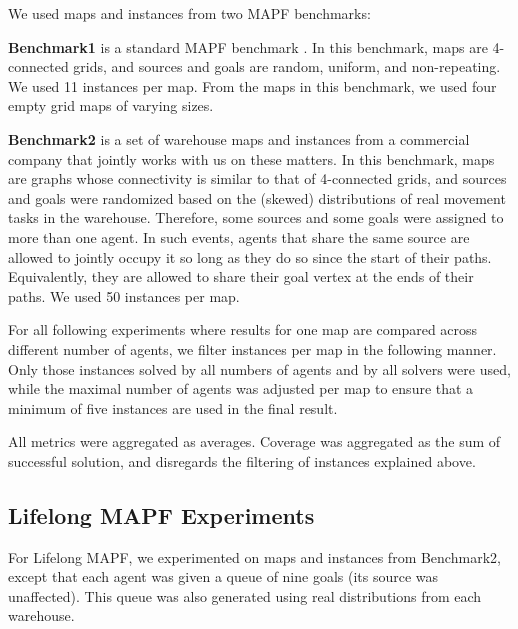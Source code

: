 \documentclass{article}
\newcommand{\benchone}{Benchmark1\xspace}
\newcommand{\benchtwo}{Benchmark2\xspace}
\newcommand{\lm}{Lifelong MAPF\xspace}
\begin{document}
We used maps and instances from two MAPF benchmarks:

\textbf{\benchone} is a standard MAPF benchmark \cite{stern2019multi}. In this benchmark, maps are 4-connected grids, and sources and goals are random, uniform, and non-repeating. We used 11 instances per map. From the maps in this benchmark, we used four empty grid maps of varying sizes.

\textbf{\benchtwo} is a set of warehouse maps and instances from a commercial company that jointly works with us on these matters. In this benchmark, maps are graphs whose connectivity is similar to that of 4-connected grids, and sources and goals were randomized based on the (skewed) distributions of real movement tasks in the warehouse. 
Therefore, some sources and some goals were assigned to more than one agent. In such events, agents that share the same source are allowed to jointly occupy it so long as they do so since the start of their paths. Equivalently, they are allowed to share their goal vertex at the ends of their paths. 
We used 50 instances per map.

For all following experiments where results for one map are compared across different number of agents, we filter instances per map in the following manner. 
Only those instances solved by all numbers of agents and by all solvers were used, while the maximal number of agents was adjusted per map to ensure that a minimum of five instances are used in the final result.

All metrics were aggregated as averages. Coverage was aggregated as the sum of successful solution, and disregards the filtering of instances explained above.


\subsection{\lm Experiments}

For \lm, we experimented on maps and instances from \benchtwo, except that each agent was given a queue of nine goals (its source was unaffected). This queue was also generated using real distributions from each warehouse.
\end{document}
